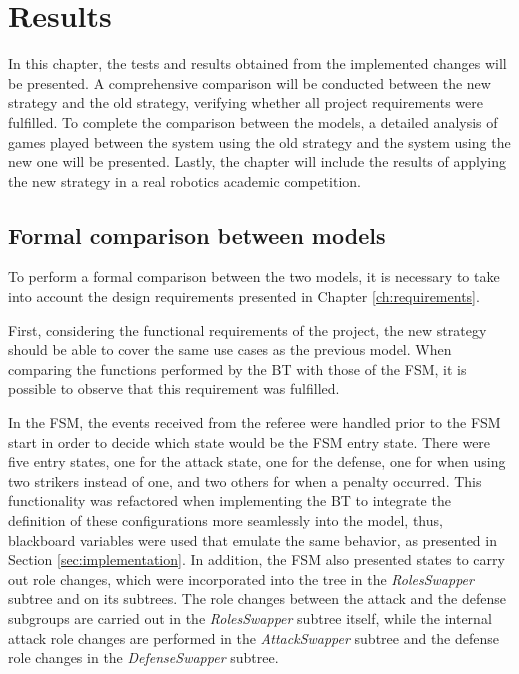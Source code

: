 \chapter{Results}
\label{ch:results}

In this chapter, the tests and results obtained from the implemented changes will be presented. A comprehensive comparison will be conducted between the new strategy and the old strategy, verifying whether all project requirements were fulfilled. To complete the comparison between the models, a detailed analysis of games played between the system using the old strategy and the system using the new one will be presented. Lastly, the chapter will include the results of applying the new strategy in a real robotics academic competition.

\section{Formal comparison between models}

To perform a formal comparison between the two models, it is necessary to take into account the design requirements presented in Chapter \ref{ch:requirements}.

First, considering the functional requirements of the project, the new strategy should be able to cover the same use cases as the previous model. When comparing the functions performed by the BT with those of the FSM, it is possible to observe that this requirement was fulfilled.

In the FSM, the events received from the referee were handled prior to the FSM start in order to decide which state would be the FSM entry state. There were five entry states, one for the attack state, one for the defense, one for when using two strikers instead of one, and two others for when a penalty occurred. This functionality was refactored when implementing the BT to integrate the definition of these configurations more seamlessly into the model, thus, blackboard variables were used that emulate the same behavior, as presented in Section \ref{sec:implementation}. In addition, the FSM also presented states to carry out role changes, which were incorporated into the tree in the \textit{RolesSwapper} subtree and on its subtrees. The role changes between the attack and the defense subgroups are carried out in the \textit{RolesSwapper} subtree itself, while the internal attack role changes are performed in the \textit{AttackSwapper} subtree and the defense role changes in the \textit{DefenseSwapper} subtree.

